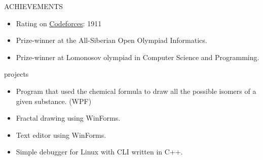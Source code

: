 \documentclass{resume}
\begin{document}
\begin{ResumeSection}{ACHIEVEMENTS}
    \begin{itemize}
        \item Rating on \href{https://codeforces.com/profile/nikita4109}{Codeforces}: 1911
        \item Prize-winner at the All-Siberian Open Olympiad Informatics. 
        \item Prize-winner at Lomonosov olympiad in Computer Science and Programming.
    \end{itemize}
\end{ResumeSection}

\begin{ResumeSection}{projects}
    \begin{itemize}
        \item {
            Program that used the chemical formula to draw all the possible isomers of a given substance. (WPF)
        }
    \end{itemize}
    \begin{itemize}
        \item {
            Fractal drawing using WinForms.
        }
    \end{itemize}
    \begin{itemize}
        \item { 
            Text editor using WinForms.
        }
    \end{itemize}
    \begin{itemize}
        \item {
            Simple debugger for Linux with CLI written in C++.
        }
    \end{itemize}
\end{ResumeSection}
\end{document}
